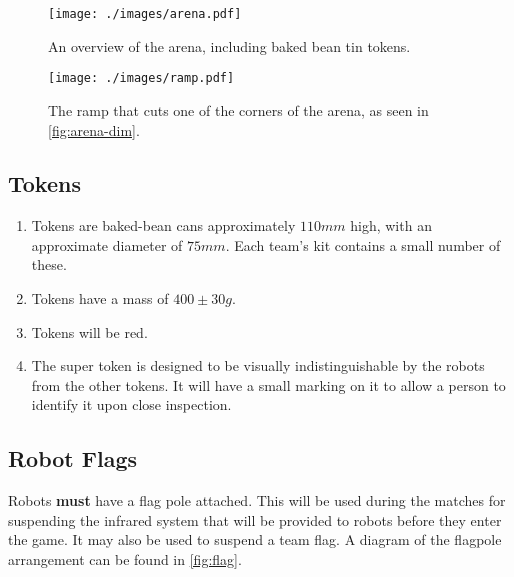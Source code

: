 \begin{figure}
  \texttt{[image: ./images/arena.pdf]}
  \caption{\label{fig:arena-dim}An overview of the arena, including baked bean tin tokens.}
\end{figure}

\begin{figure}
  \begin{center}
    \texttt{[image: ./images/ramp.pdf]}
  \end{center}
  \caption{\label{fig:ramp-on-its-own}The ramp that cuts one of the corners of the arena, as seen in \autoref{fig:arena-dim}.}
\end{figure}

\subsection{Tokens}
\label{sub:Tokens}
\begin {enumerate}
\item Tokens are baked-bean cans approximately $110mm$ high, with an approximate diameter of $75mm$.
 Each team's kit contains a small number of these.
\item Tokens have a mass of $400\pm30g$.
\item Tokens will be red.
\item The super token is designed to be visually indistinguishable by the robots from the other tokens.  It will have a small marking on it to allow a person to identify it upon close inspection.
\end {enumerate}

\subsection{Robot Flags}
\label{sub:Flags}

Robots \textbf{must} have a flag pole attached.  This will be used during the matches for suspending the infrared system that will be provided to robots before they enter the game.  It may also be used to suspend a team flag.  A diagram of the flagpole arrangement can be found in \autoref{fig:flag}.

